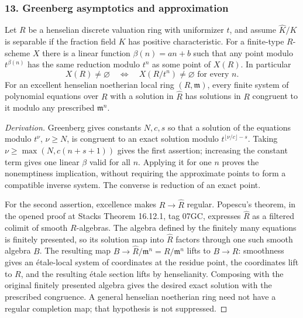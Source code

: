 \subsubsection{13. Greenberg asymptotics and approximation}
\begin{proposition}\label{B:subject13}
Let $R$ be a henselian discrete valuation ring with uniformizer $t$, and assume $\widehat K/K$ is separable if the fraction field $K$ has positive characteristic. For a finite-type $R$-scheme $X$ there is a linear function $\beta(n)=an+b$ such that any point modulo $t^{\beta(n)}$ has the same reduction modulo $t^n$ as some point of $X(R)$. In particular
\[
 X(R)\ne\varnothing\quad\Longleftrightarrow\quad
 X(R/t^n)\ne\varnothing\text{ for every }n.
\]
For an excellent henselian noetherian local ring $(R,\mathfrak m)$, every finite system of polynomial equations over $R$ with a solution in $\widehat R$ has solutions in $R$ congruent to it modulo any prescribed $\mathfrak m^n$.
\end{proposition}
\begin{proof}[Derivation]
Greenberg \cite[Theorem 1 and Corollaries 1--2]{BGreenberg1966} gives constants $N,c,s$ so that a solution of the equations modulo $t^\nu$, $\nu\ge N$, is congruent to an exact solution modulo $t^{\lfloor\nu/c\rfloor-s}$. Taking $\nu\ge\max(N,c(n+s+1))$ gives the first assertion; increasing the constant term gives one linear $\beta$ valid for all $n$. Applying it for one $n$ proves the nonemptiness implication, without requiring the approximate points to form a compatible inverse system. The converse is reduction of an exact point.

For the second assertion, excellence makes $R\to\widehat R$ regular. Popescu's theorem, in the opened proof at Stacks Theorem 16.12.1, tag 07GC, expresses $\widehat R$ as a filtered colimit of smooth $R$-algebras. The algebra defined by the finitely many equations is finitely presented, so its solution map into $\widehat R$ factors through one such smooth algebra $B$. The resulting map $B\to\widehat R/\mathfrak m^n=R/\mathfrak m^n$ lifts to $B\to R$: smoothness gives an \'etale-local system of coordinates at the residue point, the coordinates lift to $R$, and the resulting \'etale section lifts by henselianity. Composing with the original finitely presented algebra gives the desired exact solution with the prescribed congruence. A general henselian noetherian ring need not have a regular completion map; that hypothesis is not suppressed.
\end{proof}

